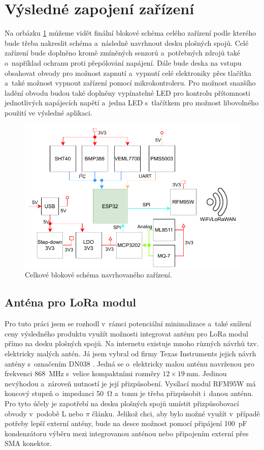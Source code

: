 \section{Výsledné zapojení zařízení}

Na orbázku \ref{fig_BlockDiagram-full} můžeme vidět finální blokové schéma celého zařízení podle kterého bude třeba nakreslit schéma a~následně navrhnout desku plošných spojů. Celé zařízení bude doplněno kromě zmíněných senzorů a~potřebných zdrojů také o~například ochranu proti přepólování napájení. Dále bude deska na vstupu obsahovat obvody pro možnost zapnutí a~vypnutí celé elektroniky přes tlačítka a~také možnost vypnout zařízení pomocí mikrokontroleru. Pro možnost snazšího ladění obvodu budou také doplněny vypínatelné LED pro kontrolu přítomnosti jednotlivých napájecích napětí a~jedna LED s~tlačítkem pro možnost libovolného použití ve výsledné aplikaci.

\begin{figure}
    \centering
    \includegraphics[width=\textwidth]{obrazky/block_schematic-full.drawio.pdf}
    \caption{Celkové blokové schéma navrhovaného zařízení.}
    \label{fig_BlockDiagram-full}
\end{figure}

\subsection{Anténa pro LoRa modul}

Pro tuto práci jsem se rozhodl v~rámci potenciální minimalizace a~také snížení ceny výsledného produktu využít možnosti integrovat anténu pro LoRa modul přímo na desku plošných spojů. Na internetu existuje mnoho různých návrhů tzv. elektricky malých antén. Já jsem vybral od firmy Texas Instruments jejich návrh antény s~označením DN038 \cite{dat_DN038}. Jedná se o~elektricky malou anténu navrženou pro frekvenci \SI{868}{\mega\hertz} s~velice kompaktními rozměry $12\times\SI{19}{\milli\metre}$. Jedinou nevýhodou a~zároveň nutností je její přizpůsobení. Vysílací modul RFM95W má koncový stupeň o~impedanci \SI{50}{\ohm} a~tomu je třeba přizpůsobit i~danou anténu. Pro tyto účely je zapotřebí na desku plošných spojů umístit přizpůsobovací obvody v~podobě L nebo $\pi$ článku. Jelikož chci, aby bylo možné využít v~případě potřeby lepší externí antény, bude na desce možnost pomocí připájení \SI{100}{\pico\farad} kondenzátoru výběru mezi integrovanou anténou nebo připojením externí přes SMA konektor.